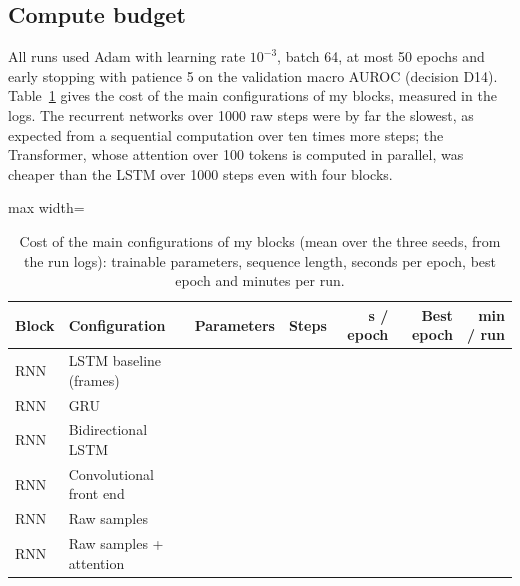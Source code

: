 \subsection{Compute budget}

All runs used Adam with learning rate $10^{-3}$, batch 64, at most 50 epochs and early stopping with patience
5 on the validation macro AUROC (decision D14). Table~\ref{tab:mllb-cost} gives the cost of the main
configurations of my blocks, measured in the logs. The recurrent networks over 1000 raw steps were by far
the slowest, as expected from a sequential computation over ten times more steps; the Transformer, whose
attention over 100 tokens is computed in parallel, was cheaper than the LSTM over 1000 steps even with four
blocks.

\begin{table}[htbp]
\centering
\caption[Cost of the main configurations of my blocks]{Cost of the main configurations of my blocks
(mean over the three seeds, from the run logs): trainable parameters, sequence length, seconds per epoch,
best epoch and minutes per run.}
\label{tab:mllb-cost}
\small
\begin{adjustbox}{max width=\textwidth}
\begin{tabular}{llrrrrr}
\toprule
Block & Configuration & Parameters & Steps & s / epoch & Best epoch & min / run \\
\midrule
RNN & LSTM baseline (frames) & \rnnParamsBase{} & \rnnStepsBase{} & \onedec{\rnnEpochTimeMeanBase} & \onedec{\rnnBestEpochMeanBase} & \onedec{\rnnTrainTimeMinMeanBase} \\
RNN & GRU & \rnnParamsGru{} & \rnnStepsGru{} & \onedec{\rnnEpochTimeMeanGru} & \onedec{\rnnBestEpochMeanGru} & \onedec{\rnnTrainTimeMinMeanGru} \\
RNN & Bidirectional LSTM & \rnnParamsBi{} & \rnnStepsBi{} & \onedec{\rnnEpochTimeMeanBi} & \onedec{\rnnBestEpochMeanBi} & \onedec{\rnnTrainTimeMinMeanBi} \\
RNN & Convolutional front end & \rnnParamsConv{} & \rnnStepsConv{} & \onedec{\rnnEpochTimeMeanConv} & \onedec{\rnnBestEpochMeanConv} & \onedec{\rnnTrainTimeMinMeanConv} \\
RNN & Raw samples & \rnnParamsRaw{} & \rnnStepsRaw{} & \onedec{\rnnEpochTimeMeanRaw} & \onedec{\rnnBestEpochMeanRaw} & \onedec{\rnnTrainTimeMinMeanRaw} \\
RNN & Raw samples + attention & \rnnParamsRawAttn{} & \rnnStepsRawAttn{} & \onedec{\rnnEpochTimeMeanRawAttn} & \onedec{\rnnBestEpochMeanRawAttn} & \onedec{\rnnTrainTimeMinMeanRawAttn} \\

\end{tabular}
\end{adjustbox}
\end{table}
